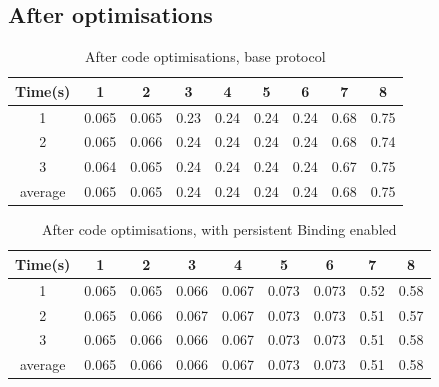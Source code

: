 \documentclass[12pt,a4paper]{article}
\begin{document}
\subsection{After optimisations}
\begin{table} [h]
\begin{center}
\begin{tabular}{|c|c|c|c|c|c|c|c|c|}
	\hline
	Time(s) & 1      & 2    & 3     & 4    & 5    & 6    & 7    & 8\\
	\hline
	1       & 0.065  & 0.065 & 0.23 & 0.24 & 0.24 & 0.24 & 0.68 & 0.75\\
	2       & 0.065  & 0.066 & 0.24 & 0.24 & 0.24 & 0.24 & 0.68 & 0.74\\
	3       & 0.064  & 0.065 & 0.24 & 0.24 & 0.24 & 0.24 & 0.67 & 0.75\\
	average & 0.065  & 0.065 & 0.24 & 0.24 & 0.24 & 0.24 & 0.68 & 0.75\\
	\hline
	
\end{tabular}
\caption{After code optimisations, base protocol}
\end{center}
\end{table}

\begin{table}
\begin{center}
\begin{tabular}{|c|c|c|c|c|c|c|c|c|}
	\hline
	Time(s) & 1      & 2     & 3     & 4     & 5    & 6    & 7    & 8\\
	\hline
	1       & 0.065  & 0.065 & 0.066 & 0.067 & 0.073 & 0.073 & 0.52 & 0.58\\
	2       & 0.065  & 0.066 & 0.067 & 0.067 & 0.073 & 0.073 & 0.51 & 0.57\\
	3       & 0.065  & 0.066 & 0.066 & 0.067 & 0.073 & 0.073 & 0.51 & 0.58\\
	average & 0.065  & 0.066 & 0.066 & 0.067 & 0.073 & 0.073 & 0.51 & 0.58\\
	\hline
\end{tabular}
\caption{After code optimisations, with persistent Binding enabled}
\end{center}
\end{table}



\pagebreak

\end{document}
